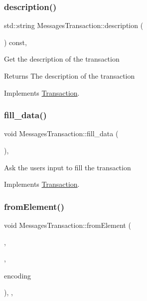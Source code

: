\subsubsection{\texorpdfstring{description()}{description()}}
{\footnotesize\ttfamily std\+::string Messages\+Transaction\+::description (\begin{DoxyParamCaption}{ }\end{DoxyParamCaption}) const\hspace{0.3cm}{\ttfamily [override]}, {\ttfamily [virtual]}}

Get the description of the transaction

\begin{DoxyReturn}{Returns}
The description of the transaction 
\end{DoxyReturn}


Implements \mbox{\hyperlink{classTransaction_ad27fb61fcd91863c57ba96a7159b4e8a}{Transaction}}.

\mbox{\label{classMessagesTransaction_aeca5802e7f1bd57e38468dc3394e2825}} 
\subsubsection{\texorpdfstring{fill\+\_\+data()}{fill\_data()}}
{\footnotesize\ttfamily void Messages\+Transaction\+::fill\+\_\+data (\begin{DoxyParamCaption}{ }\end{DoxyParamCaption})\hspace{0.3cm}{\ttfamily [override]}, {\ttfamily [virtual]}}

Ask the user\textquotesingle{}s input to fill the transaction 

Implements \mbox{\hyperlink{classTransaction_a73b16e3d7e4c24e5b4da203740691e65}{Transaction}}.

\mbox{\label{classMessagesTransaction_aa70ed75ff16f6afa61d82458488069d4}} 
\subsubsection{\texorpdfstring{from\+Element()}{fromElement()}}
{\footnotesize\ttfamily void Messages\+Transaction\+::from\+Element (\begin{DoxyParamCaption}\item[{\mbox{\hyperlink{classElementObject}{Element\+Object}} $\ast$}]{,  }\item[{const \mbox{\hyperlink{classSerializer}{Serializer}} $\ast$}]{,  }\item[{const char $\ast$}]{encoding }\end{DoxyParamCaption})\hspace{0.3cm}{\ttfamily [override]}, {\ttfamily [protected]}, {\ttfamily [virtual]}}

